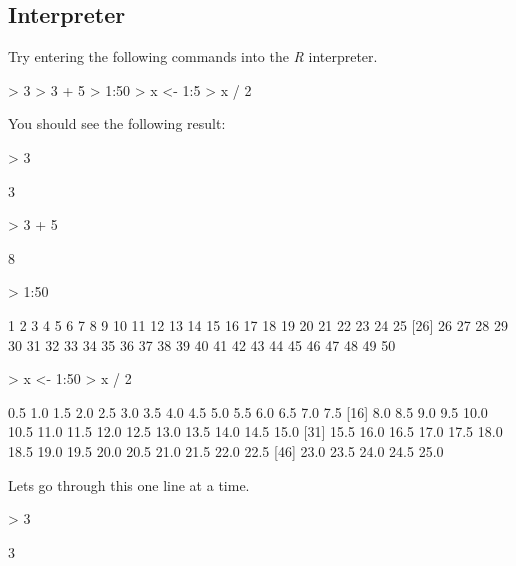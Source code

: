 \documentclass[10pt,letterpaper]{article}
\newenvironment{Schunk}{}{}
\begin{document}
\subsection{Interpreter}

Try entering the following commands into the \emph{R} interpreter.

\begin{Schunk}
\begin{Sinput}
> 3
> 3 + 5
> 1:50
> x <- 1:5
> x / 2
\end{Sinput}
\end{Schunk}

You should see the following result:

\begin{Schunk}
\begin{Sinput}
> 3
\end{Sinput}
\begin{Soutput}
[1] 3
\end{Soutput}
\begin{Sinput}
> 3 + 5
\end{Sinput}
\begin{Soutput}
[1] 8
\end{Soutput}
\begin{Sinput}
> 1:50
\end{Sinput}
\begin{Soutput}
 [1]  1  2  3  4  5  6  7  8  9 10 11 12 13 14 15 16 17 18 19 20 21 22 23 24 25
[26] 26 27 28 29 30 31 32 33 34 35 36 37 38 39 40 41 42 43 44 45 46 47 48 49 50
\end{Soutput}
\begin{Sinput}
> x <- 1:50
> x / 2
\end{Sinput}
\begin{Soutput}
 [1]  0.5  1.0  1.5  2.0  2.5  3.0  3.5  4.0  4.5  5.0  5.5  6.0  6.5  7.0  7.5
[16]  8.0  8.5  9.0  9.5 10.0 10.5 11.0 11.5 12.0 12.5 13.0 13.5 14.0 14.5 15.0
[31] 15.5 16.0 16.5 17.0 17.5 18.0 18.5 19.0 19.5 20.0 20.5 21.0 21.5 22.0 22.5
[46] 23.0 23.5 24.0 24.5 25.0
\end{Soutput}
\end{Schunk}

Lets go through this one line at a time.

\begin{Schunk}
\begin{Sinput}
> 3
\end{Sinput}
\begin{Soutput}
[1] 3
\end{Soutput}
\end{Schunk}
\end{document}
